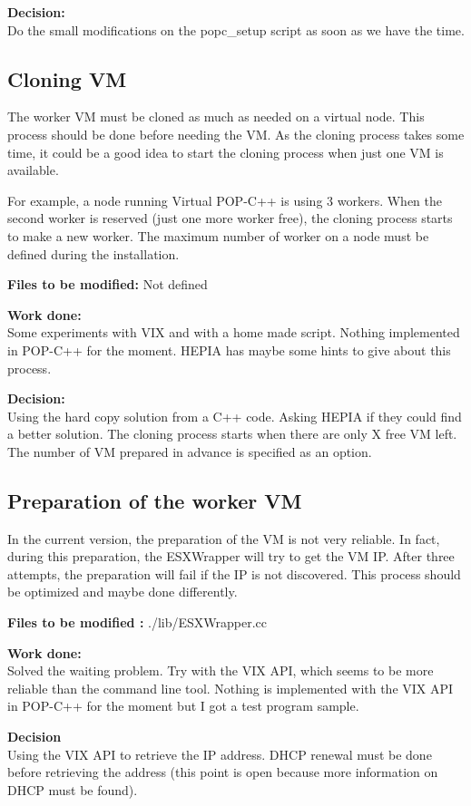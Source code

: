 \textbf{Decision:}\\
Do the small modifications on the popc\_setup script as soon as we have the time. 

\subsection{Cloning VM}
The worker VM must be cloned as much as needed on a virtual node. This process should be done before needing the VM. As the cloning process takes some time, it could be a good idea to start the cloning process when just one VM is available. 

For example, a node running Virtual POP-C++ is using 3 workers. When the second worker is reserved (just one more worker free), the cloning process starts to make a new worker. The maximum number of worker on a node must be defined during the installation.\s

\textbf{Files to be modified: } Not defined \s

\textbf{Work done:}\\
Some experiments with VIX and with a home made script. Nothing implemented in POP-C++ for the moment. HEPIA has maybe some hints to give about this process. \s

\textbf{Decision:}\\
Using the hard copy solution from a C++ code. Asking HEPIA if they could find a better solution. The cloning process starts when there are only X free VM left. The number of VM prepared in advance is specified as an option.

\subsection{Preparation of the worker VM}
In the current version, the preparation of the VM is not very reliable. In fact, during this preparation, the ESXWrapper will try to get the VM IP. After three attempts, the preparation will fail if the IP is not discovered. This process should be optimized and maybe done differently.\s

\textbf{Files to be modified : } ./lib/ESXWrapper.cc\s

\textbf{Work done:}\\
Solved the waiting problem. Try with the VIX API, which seems to be more reliable than the command line tool. Nothing is implemented with the VIX API in POP-C++ for the moment but I got a test program sample. \s

\textbf{Decision}\\
Using the VIX API to retrieve the IP address. DHCP renewal must be done before retrieving the address (this point is open because more information on DHCP must be found).

